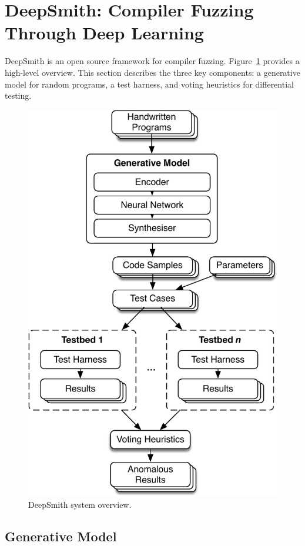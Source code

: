 \section{DeepSmith: Compiler Fuzzing Through Deep Learning}
\label{sec:deepsmith}

DeepSmith is an open source framework for compiler fuzzing. Figure~\ref{fig:deepsmith} provides a high-level overview. This section describes the three key components: a generative model for random programs, a test harness, and voting heuristics for differential testing.

\begin{figure}
  \centering
  \includegraphics[width=.7\columnwidth]{img/deepsmith}
  \caption[DeepSmith system overview]{%
    DeepSmith system overview. 
  }%
  \label{fig:deepsmith}
\end{figure}

\subsection{Generative Model}

